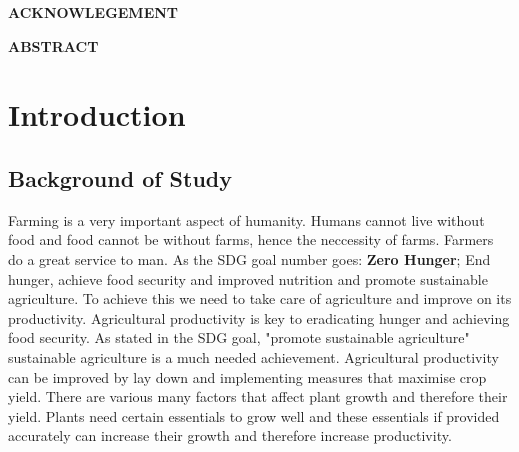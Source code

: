 \documentclass[12pt, a4paper]{article}
\begin{document}
\begin{center}
\textbf{ACKNOWLEGEMENT}
\end{center}
\newpage

\begin{center}
\textbf{ABSTRACT}
\end{center}

\newpage


\tableofcontents
\newpage
{}
\section{Introduction}
\subsection{Background of Study}
Farming is a very important aspect of humanity. Humans cannot live without food and food cannot be without farms, hence the neccessity of farms. Farmers do a great service to man. As the SDG goal number goes: \textbf{Zero Hunger}; End hunger, achieve food security and improved nutrition and promote sustainable agriculture. To achieve this we need to take care of agriculture and improve on its productivity. Agricultural productivity is key to eradicating hunger and achieving food security. As stated in the SDG goal, "promote sustainable agriculture" sustainable agriculture is a much needed achievement. Agricultural productivity can be improved by lay down and implementing measures that maximise crop yield. There are various many factors that affect plant growth and therefore their yield. Plants need certain essentials to grow well and these essentials if provided accurately can increase their growth and therefore increase productivity.
\\
\end{document}
